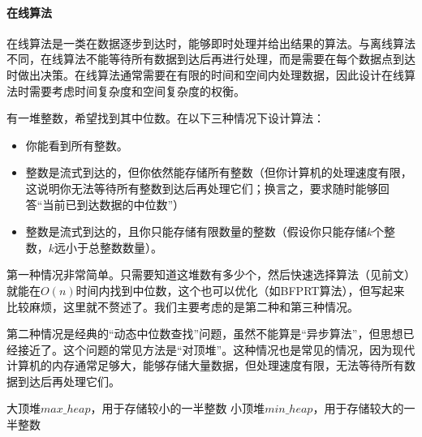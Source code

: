 \paragraph{在线算法} 在线算法是一类在数据逐步到达时，能够即时处理并给出结果的算法。与离线算法不同，在线算法不能等待所有数据到达后再进行处理，而是需要在每个数据点到达时做出决策。在线算法通常需要在有限的时间和空间内处理数据，因此设计在线算法时需要考虑时间复杂度和空间复杂度的权衡。

\begin{example}
    有一堆整数，希望找到其中位数。在以下三种情况下设计算法：
    \begin{itemize}
        \item 你能看到所有整数。
        \item 整数是流式到达的，但你依然能存储所有整数（但你计算机的处理速度有限，这说明你无法等待所有整数到达后再处理它们；换言之，要求随时能够回答“当前已到达数据的中位数”）
        \item 整数是流式到达的，且你只能存储有限数量的整数（假设你只能存储$k$个整数，$k$远小于总整数数量）。
    \end{itemize}
\end{example}

第一种情况非常简单。只需要知道这堆数有多少个，然后快速选择算法（见前文）就能在$O(n)$时间内找到中位数，这个也可以优化（如BFPRT算法），但写起来比较麻烦，这里就不赘述了。我们主要考虑的是第二种和第三种情况。

第二种情况是经典的“动态中位数查找”问题，虽然不能算是“异步算法”，但思想已经接近了。这个问题的常见方法是“对顶堆”。这种情况也是常见的情况，因为现代计算机的内存通常足够大，能够存储大量数据，但处理速度有限，无法等待所有数据到达后再处理它们。
\begin{algorithm}
    \caption{对顶堆法}
    大顶堆$max\_heap$，用于存储较小的一半整数\;
    小顶堆$min\_heap$，用于存储较大的一半整数\;
\end{algorithm}


